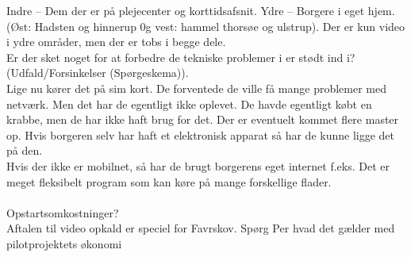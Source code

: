 Indre – Dem der er på plejecenter og korttidsafsnit. 
Ydre – Borgere i eget hjem. (Øst: Hadsten og hinnerup 0g vest: hammel thorsøe og ulstrup). 
Der er kun video i ydre områder, men der er tobs i begge dele. \\
Er der sket noget for at forbedre de tekniske problemer i er stødt ind i? (Udfald/Forsinkelser (Spørgeskema)).\\ 
Lige nu kører det på sim kort. De forventede de ville få mange problemer med netværk. Men det har de egentligt ikke oplevet. De havde egentligt købt en krabbe, men de har ikke haft brug for det. Der er eventuelt kommet flere master op. Hvis borgeren selv har haft et elektronisk apparat så har de kunne ligge det på den. \\
Hvis der ikke er mobilnet, så har de brugt borgerens eget internet f.eks. Det er meget fleksibelt program som kan køre på mange forskellige flader. \\\\
Opstartsomkostninger?\\
Aftalen til video opkald er speciel for Favrskov. Spørg Per hvad det gælder med pilotprojektets økonomi

